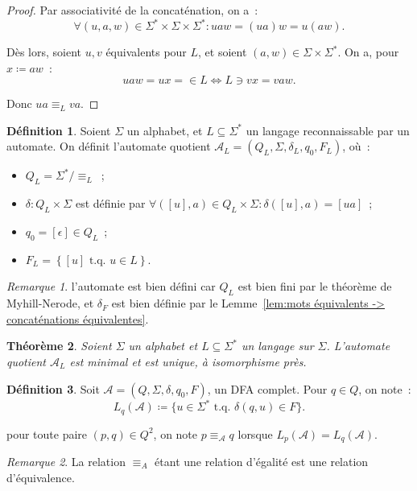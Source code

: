 \documentclass{article}
\newtheorem{thm}{Théorème}[section]
\theoremstyle{definition}
\newtheorem{déf}[thm]{Définition}
\theoremstyle{remark}
\newtheorem*{rmq}{Remarque}
\newcommand{\tq}{\text{ t.q. }}
\newcommand{\automaton}{(Q, \Sigma, \delta, q_0, F)}
\begin{document}
	\begin{proof} Par associativité de la concaténation, on a~:
	\[\forall (u, a, w) \in \Sigma^* \times \Sigma \times \Sigma^* : uaw = (ua)w = u(aw).\]

	Dès lors, soient $u, v$ équivalents pour $L$, et soient $(a, w) \in \Sigma \times \Sigma^*$. On a, pour $x \coloneqq aw$~:
	\[uaw = ux = \in L \iff L \ni vx = vaw.\]

	Donc $ua \equiv_L va$.
	\end{proof}

	\begin{déf} Soient $\Sigma$ un alphabet, et $L \subseteq \Sigma^*$ un langage reconnaissable par un automate. On définit l'automate quotient
	$\mathcal A_L = (Q_L, \Sigma, \delta_L, q_0, F_L)$, où~:
	\begin{itemize}
		\item $Q_L = \Sigma^* / \equiv_L$~;
		\item $\delta : Q_L \times \Sigma$ est définie par $\forall ([u], a) \in Q_L \times \Sigma : \delta([u], a) = [ua]$~;
		\item $q_0 = [\epsilon] \in Q_L$~;
		\item $F_L = \left\{[u] \tq u \in L\right\}$.
	\end{itemize}
	\end{déf}

	\begin{rmq} l'automate est bien défini car $Q_L$ est bien fini par le théorème de Myhill-Nerode, et $\delta_F$ est bien définie par le
	Lemme~\ref{lem:mots équivalents -> concaténations équivalentes}.
	\end{rmq}

	\begin{thm} Soient $\Sigma$ un alphabet et $L \subseteq \Sigma^*$ un langage sur $\Sigma$. L'automate quotient $\mathcal A_L$ est minimal et
	est unique, à isomorphisme près.
	\end{thm}

	\begin{déf} Soit $\mathcal A = \automaton$, un DFA complet. Pour $q \in Q$, on note~:
	\[L_q(\mathcal A) \coloneqq \{u \in \Sigma^* \tq \delta(q, u) \in F\}.\]

	pour toute paire $(p, q) \in Q^2$, on note $p \equiv_{\mathcal A} q$ lorsque $L_p(\mathcal A) = L_q(\mathcal A)$.
	\end{déf}

	\begin{rmq} La relation $\equiv_A$ étant une relation d'égalité est une relation d'équivalence.
	\end{rmq}
\end{document}
